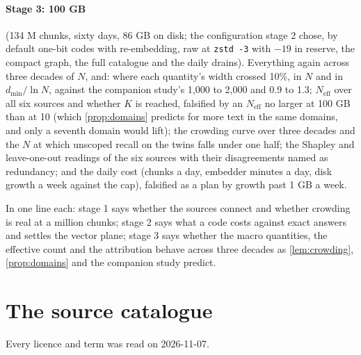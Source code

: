 \documentclass[11pt]{article}
\theoremstyle{plain}
\theoremstyle{definition}
\theoremstyle{remark}
\newcommand{\code}[1]{\texttt{#1}}
\newcommand{\Neff}{N_{\mathrm{eff}}}
\begin{document}
\paragraph{Stage 3: 100 GB} (134 M chunks, sixty days, 86 GB on disk; the configuration stage 2
chose, by default one-bit codes with re-embedding, raw at \code{zstd -3} with $-19$ in reserve, the
compact graph, the full catalogue and the daily drains). Everything again across three decades of
$N$, and: where each quantity's width crossed 10\%, in $N$ and in $d_{\min}/\ln N$, against the
companion study's 1,000 to 2,000 and 0.9 to 1.3; $\Neff$ over all six sources and whether $K$ is
reached, falsified by an $\Neff$ no larger at 100 GB than at 10 (which \cref{prop:domains}
predicts for more text in the same domains, and only a seventh domain would lift); the crowding
curve over three decades and the $N$ at which unscoped recall on the twins falls under one half;
the Shapley and leave-one-out readings of the six sources with their disagreements named as
redundancy; and the daily cost (chunks a day, embedder minutes a day, disk growth a week against
the cap), falsified as a plan by growth past 1 GB a week.

In one line each: stage 1 says whether the sources connect and whether crowding is real at a
million chunks; stage 2 says what a code costs against exact answers and settles the vector plane;
stage 3 says whether the macro quantities, the effective count and the attribution behave across
three decades as \cref{lem:crowding}, \cref{prop:domains} and the companion study predict.

\section{The source catalogue}\label{sec:catalogue}
Every licence and term was read on 2026-11-07.
\end{document}
